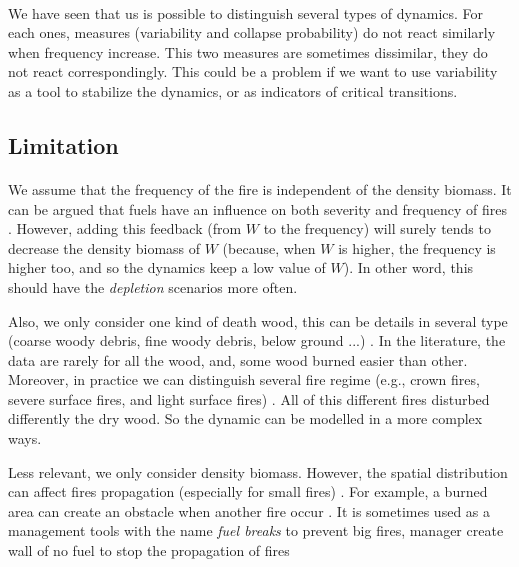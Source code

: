 \documentclass{article}
\begin{document}
\paragraph{} %
We have seen that us is possible to distinguish several types of dynamics. For each ones, measures (variability and collapse probability) do not react similarly when frequency increase. This two measures are sometimes dissimilar, they do not react correspondingly. This could be a problem if we want to use variability as a tool to stabilize the dynamics, or as indicators of critical transitions.





\subsection{Limitation}

\paragraph{}
\label{discussion_frequency_ass}
We assume that the frequency of the fire is independent of the density biomass. It can be argued that fuels have an influence on both severity and frequency  of fires \citep{schoennagel_interaction_2004}. However, adding this feedback (from $W$ to the frequency) will surely tends to decrease the density biomass of $W$ (because, when $W$ is higher, the frequency is higher too, and so the dynamics keep a low value of $W$). In other word, this should have the \textit{depletion} scenarios more often.

Also, we only consider one kind of death wood, this can be details in several type (coarse woody debris, fine woody debris, below ground ...) \citep{russell_quantifying_2015}. In the literature, the data are rarely for all the wood, and, some wood burned easier than other. Moreover, in practice we can distinguish several fire regime (e.g., crown fires, severe surface fires, and light surface fires) \citep{reichle_fire_1981}. All of this different fires disturbed differently the dry wood. So the dynamic can be modelled in a more complex ways.

Less relevant, we only consider density biomass. However, the spatial distribution can affect fires propagation (especially for small fires) \citep{beaty_spatial_2002}. For example, a burned area can create an obstacle when another fire occur \citep{bergeron_natural_2002, ager_modeling_2007}. It is sometimes used as a management tools with the name \textit{fuel breaks} to prevent big fires, manager create wall of no fuel to stop the propagation of fires \citep{syphard_comparing_2011, agee_use_2000}
\end{document}
